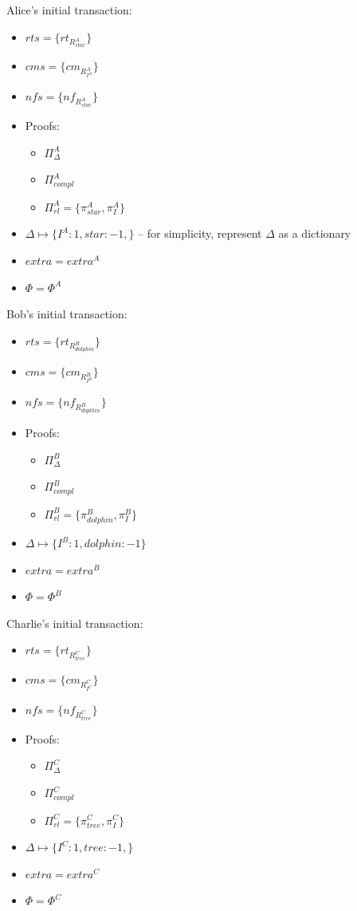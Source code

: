 \documentclass[
    11pt,            %
    techreport,        %
    affiltop,       %
]{art}
\begin{document}
Alice's initial transaction:
\begin{itemize}
    \item $rts= \{rt_{R^A_{star}}\}$
    \item $cms = \{cm_{R^A_{I^{A}}}\}$
    \item $nfs = \{nf_{R^A_{star}}\}$
    \item Proofs:
    \begin{itemize}
        \item $\Pi^A_{\Delta}$
        \item $\Pi^A_{compl}$
        \item $\Pi^A_{rl} = \{\pi^A_{star}, \pi^A_I\}$
    \end{itemize}
    \item $\Delta \mapsto \{I^{A}: 1, star: -1, \}$ – for simplicity, represent $\Delta$ as a dictionary
    \item $extra = extra^A$
    \item $\Phi = \Phi^A$
\end{itemize}

Bob's initial transaction:
\begin{itemize}
    \item $rts = \{rt_{R^B_{dolphin}}\}$
    \item $cms = \{cm_{R^B_{I^{B}}}\}$
    \item $nfs = \{nf_{R^B_{doplhin}}\}$
    \item Proofs:
    \begin{itemize}
        \item $\Pi^B_{\Delta}$
        \item $\Pi^B_{compl}$
        \item $\Pi^B_{rl} = \{\pi^B_{dolphin}, \pi^B_I\}$
    \end{itemize}
    \item $\Delta \mapsto \{I^{B}: 1, dolphin: -1 \}$
    \item $extra = extra^B$
    \item $\Phi = \Phi^B$
\end{itemize}

Charlie's initial transaction:
\begin{itemize}
    \item $rts = \{rt_{R^C_{tree}}\}$
    \item $cms = \{cm_{R^C_{I^{C}}}\}$
    \item $nfs = \{nf_{R^C_{tree}}\}$
    \item Proofs:
    \begin{itemize}
        \item $\Pi^C_{\Delta}$
        \item $\Pi^C_{compl}$
        \item $\Pi^C_{rl} = \{\pi^C_{tree}, \pi^C_I\}$
    \end{itemize}
    \item $\Delta \mapsto \{I^{C}: 1, tree: -1, \}$
    \item $extra = extra^C$
    \item $\Phi = \Phi^C$
\end{itemize}
\end{document}
